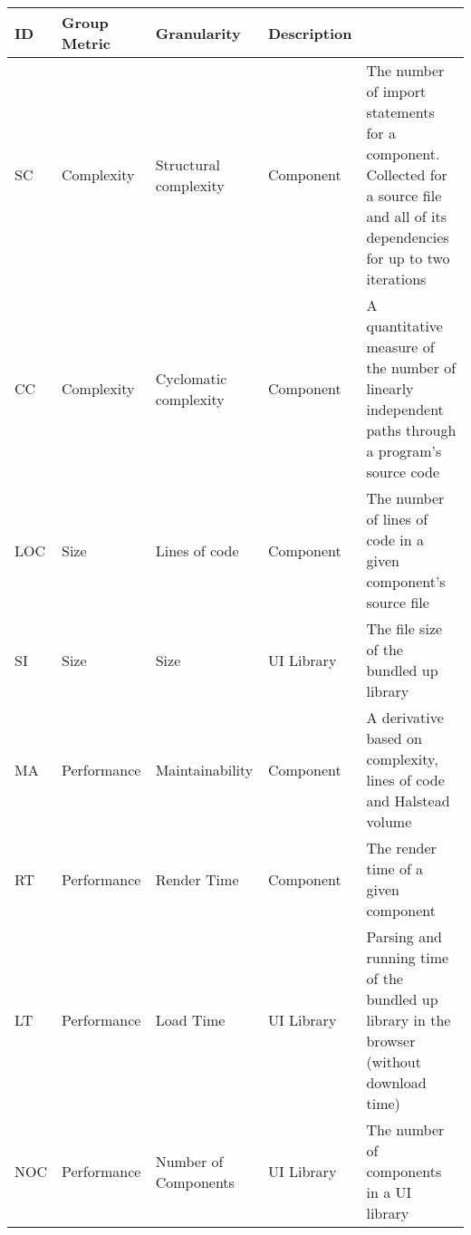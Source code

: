 \begin{table}[htbp]
  \tiny
  \begin{tabularx}{\textwidth}{|l|l|l|l|X|}
    \toprule
    \textbf{ID} & \textbf{Group} \textbf{Metric} & \textbf{Granularity}   & \textbf{Description}                                                                                                                                                 \\ \midrule
    SC          & Complexity                     & Structural complexity  & Component                        & The number of import statements for a component. Collected for a source file and all of its dependencies for up to two iterations \\ \hline
    CC          & Complexity                     & Cyclomatic complexity  & Component                        & A quantitative measure of the number of linearly independent paths through a program's source code~\cite{1702388}                             \\ \hline
    LOC         & Size                           & Lines of code          & Component                        & The number of lines of code in a given component's source file                                                                    \\ \hline
    SI          & Size                           & Size                   & UI Library                       & The file size of the bundled up library                                                                                           \\ \hline
    MA          & Performance                    & Maintainability        & Component                        & A derivative based on complexity, lines of code and Halstead volume~\cite{halstead1977elements}                                   \\ \hline
    RT          & Performance                    & Render Time            & Component                        & The render time of a given component                                                                                              \\ \hline
    LT          & Performance                    & Load Time              & UI Library                       & Parsing and running time of the bundled up library in the browser (without download time)                                         \\ \hline
    NOC         & Performance                    & Number of Components   & UI Library                       & The number of components in a UI library                                                                                          \\ \hline

\end{tabularx}
\end{table}
